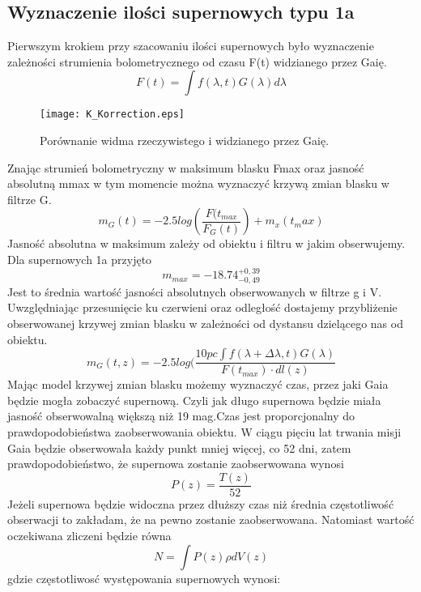 \documentclass[polish,12pt]{pracamgr}
\begin{document}
\subsection{Wyznaczenie ilości supernowych typu 1a}
Pierwszym krokiem przy szacowaniu ilości supernowych było wyznaczenie zależności strumienia bolometrycznego od czasu F(t) widzianego przez Gaię. 
	\begin{equation}
	F(t) = \int f(\lambda,t) G(\lambda) d\lambda
	\end{equation}



\begin{figure}[!h]
\centering
\texttt{[image: K\_Korrection.eps]}
\caption{Porównanie widma rzeczywistego i widzianego przez Gaię.}
\label{ K_korrection Podpis}
\end{figure}

Znając strumień bolometryczny w maksimum blasku Fmax oraz jasność absolutną mmax w tym momencie można wyznaczyć krzywą zmian blasku w filtrze G.
	\begin{equation}
	m_G(t) = -2.5log(\frac{F(t_{max}}{F_G(t)}) + m_x(t_max)
	\end{equation}
Jasność absolutna w maksimum zależy od obiektu i filtru w jakim obserwujemy. Dla supernowych 1a przyjęto
	\begin{equation}
	m_{max} = -18.74^{+0,39}_{-0,49}
	\end{equation}
Jest to średnia wartość jasności absolutnych obserwowanych w filtrze g i V. Uwzględniając przesunięcie ku czerwieni oraz odległość dostajemy przybliżenie obserwowanej krzywej zmian blasku w zależności od dystansu dzielącego nas od obiektu.
	\begin{equation}
	m_G(t,z) = -2.5log(\frac{10pc \int f(\lambda + \Delta \lambda,t)G(\lambda)}{F(t_{max}) \cdot dl(z)}
	\end{equation}
Mając model krzywej zmian blasku możemy wyznaczyć czas, przez jaki Gaia będzie mogła zobaczyć supernową. Czyli jak długo supernowa będzie miała jasność obserwowalną większą niż 19 mag.Czas jest proporcjonalny do prawdopodobieństwa zaobserwowania obiektu. W ciągu pięciu lat trwania misji Gaia będzie obserwowała każdy punkt mniej więcej, co 52 dni, zatem prawdopodobieństwo, że supernowa  zostanie zaobserwowana wynosi
	\begin{equation}
	P(z) = \frac{T(z)}{52} 
	\end{equation}
Jeżeli supernowa będzie widoczna przez dłuższy czas niż średnia częstotliwość obserwacji to zakładam, że na pewno zostanie zaobserwowana. Natomiast wartość oczekiwana zliczeni będzie równa
	\begin{equation}
	N = \int P(z) \rho dV(z)
	\end{equation}
gdzie częstotliwosć występowania supernowych wynosi:
\end{document}
